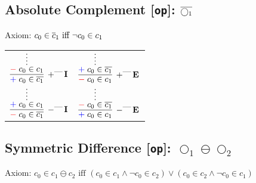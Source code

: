 \documentclass[11pt]{article}
\begin{document}
\subsection*{Absolute Complement [\texttt{op}]: $\overline{\bigcirc_1}$}

\smallskip
\noindent
Axiom: $c_0\in \overline{c}_1\text{ iff }
\lnot c_0\in c_1$
\smallskip

\noindent
\begin{tabular}{cc}
$
\infer[\AssertRule{\AbsComplRule}\Intro{}]{\Assert{c_0\in\AbsCompl{c_1}}}{
	\infer*{\Deny{c_0\in c_1}}{}
}
$
\hspace{1cm}
&
$
\infer[\AssertRule{\AbsComplRule}\Elim{}]{\Deny{c_0\in c_1}}{
	\infer*{\Assert{c_0\in\AbsCompl{c_1}}}{}
}
$
\\[2mm]
$
\infer[\DenyRule{\AbsComplRule}\Intro{}]{\Deny{c_0\in\AbsCompl{c_1}}}{
	\infer*{\Assert{c_0\in c_1}}{}
}
$
\hspace{1cm}
&
$
\infer[\DenyRule{\AbsComplRule}\Elim{}]{\Assert{c_0\in c_1}}{
	\infer*{\Deny{c_0\in\AbsCompl{c_1}}}{}
}
$
\end{tabular}
\bigskip


\newpage

\subsection*{Symmetric Difference [\texttt{op}]: $\bigcirc_1\ominus\bigcirc_2$}

\smallskip
\noindent
Axiom: $c_0\in c_1\ominus c_2\text{ iff }
(c_0\in c_1 \land \lnot c_0 \in c_2) \lor (c_0\in c_2 \land \lnot c_0 \in c_1)$
\smallskip
\end{document}
